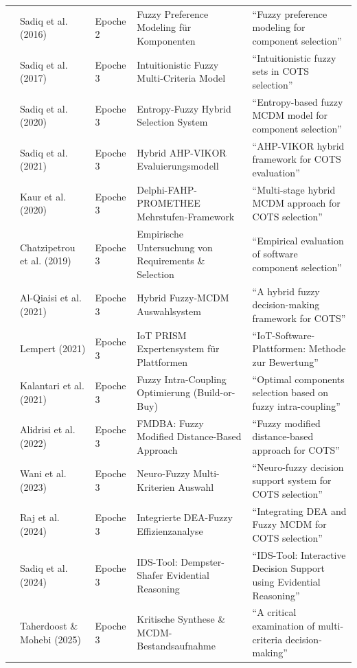 \begin{longtable}{p{2.2cm} p{2.8cm} p{1.8cm} p{4.2cm} p{3.5cm}}
\cite{P9SATBH5} & Sadiq et al. (2016) & Epoche 2 & Fuzzy Preference Modeling für Komponenten & \enquote{Fuzzy preference modeling for component selection} \\
\cite{JT5X3FIG} & Sadiq et al. (2017) & Epoche 3 & Intuitionistic Fuzzy Multi-Criteria Model & \enquote{Intuitionistic fuzzy sets in COTS selection} \\
\cite{DFASRUVC} & Sadiq et al. (2020) & Epoche 3 & Entropy-Fuzzy Hybrid Selection System & \enquote{Entropy-based fuzzy MCDM model for component selection} \\
\cite{QNWK8SAP} & Sadiq et al. (2021) & Epoche 3 & Hybrid AHP-VIKOR Evaluierungsmodell & \enquote{AHP-VIKOR hybrid framework for COTS evaluation} \\
\cite{NZJEEPAC} & Kaur et al. (2020) & Epoche 3 & Delphi-FAHP-PROMETHEE Mehrstufen-Framework & \enquote{Multi-stage hybrid MCDM approach for COTS selection} \\
\cite{UK2X9C4W} & Chatzipetrou et al. (2019) & Epoche 3 & Empirische Untersuchung von Requirements \& Selection & \enquote{Empirical evaluation of software component selection} \\
\cite{5BBYQCJB} & Al-Qiaisi et al. (2021) & Epoche 3 & Hybrid Fuzzy-MCDM Auswahlsystem & \enquote{A hybrid fuzzy decision-making framework for COTS} \\
\cite{RRU375GB} & Lempert (2021) & Epoche 3 & IoT PRISM Expertensystem für Plattformen & \enquote{IoT-Software-Plattformen: Methode zur Bewertung} \\
\cite{UFCEV52H} & Kalantari et al. (2021) & Epoche 3 & Fuzzy Intra-Coupling Optimierung (Build-or-Buy) & \enquote{Optimal components selection based on fuzzy intra-coupling} \\
\cite{FVINCQ89} & Alidrisi et al. (2022) & Epoche 3 & FMDBA: Fuzzy Modified Distance-Based Approach & \enquote{Fuzzy modified distance-based approach for COTS} \\
\cite{8KF4HAZS} & Wani et al. (2023) & Epoche 3 & Neuro-Fuzzy Multi-Kriterien Auswahl & \enquote{Neuro-fuzzy decision support system for COTS selection} \\
\cite{YVWGHAWQ} & Raj et al. (2024) & Epoche 3 & Integrierte DEA-Fuzzy Effizienzanalyse & \enquote{Integrating DEA and Fuzzy MCDM for COTS selection} \\
\cite{LNQHES84} & Sadiq et al. (2024) & Epoche 3 & IDS-Tool: Dempster-Shafer Evidential Reasoning & \enquote{IDS-Tool: Interactive Decision Support using Evidential Reasoning} \\
\cite{LPC92LAP} & Taherdoost \& Mohebi (2025) & Epoche 3 & Kritische Synthese \& MCDM-Bestandsaufnahme & \enquote{A critical examination of multi-criteria decision-making} \\
\end{longtable}

